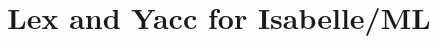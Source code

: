 \title{Lex and Yacc for Isabelle/ML}
\author{}

\usepackage{amsmath}
\usepackage{amssymb}

\makeatletter
\newcommand{\dotminus}{\ensuremath{\mathbin{\text{\@dotminus}}}}

 \newcommand{\@dotminus}{%
  \ooalign{\hidewidth\raise1ex\hbox{.}\hidewidth\cr$\m@th-$\cr}%
 }
 \makeatother

\newcommand{\ocircle}{\circ}
\newcommand{\isasymdotminus}{\dotminus}
\newcommand{\sidemark}[1]{\mbox{}\marginpar[\small\raggedleft\hspace{0pt}#1]{\small\raggedright\hspace{0pt}#1}}
\newcommand{\key}[1]{\emph{#1}\sidemark{#1}}
\newtheorem{definition}{Definition}[section]

\renewcommand{\setisabellecontext}[1]{\markright{\href{#1.html}{#1.thy}}}

